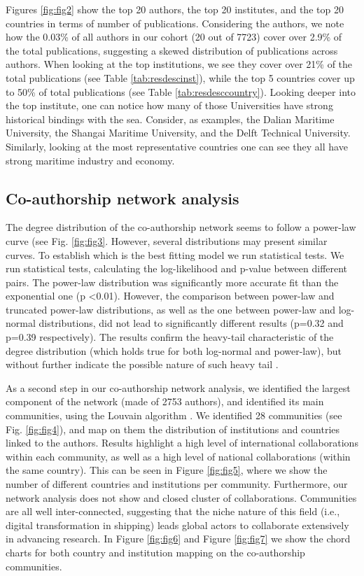 \documentclass[jmse,review,submit,pdftex,moreauthors]{Definitions/mdpi}
\begin{document}
Figures \ref{fig:fig2} show the top 20 authors, the top 20 institutes, and the top 20 countries in terms of number of publications. Considering the authors, we note how the 0.03\% of all authors in our cohort (20 out of 7723) cover over 2.9\% of the total publications, suggesting a skewed distribution of publications across authors. When looking at the top institutions, we see they cover over 21\% of the total publications (see Table \ref{tab:resdescinst}), while the top 5 countries cover up to 50\% of total publications (see Table \ref{tab:resdesccountry}). Looking deeper into the top institute, one can notice how many of those Universities have strong historical bindings with the sea. Consider, as examples, the Dalian Maritime University, the Shangai Maritime University, and the Delft Technical University. Similarly, looking at the most representative countries one can see they all have strong maritime industry and economy.

\subsection{Co-authorship network analysis}
The degree distribution of the co-authorship network seems to follow a power-law curve (see Fig. \ref{fig:fig3}. However, several distributions may present similar curves. To establish which is the best fitting model we run statistical tests. We run statistical tests, calculating the log-likelihood and p-value between different pairs. The power-law distribution was significantly more accurate fit than the exponential one (p \textless 0.01). However, the comparison between power-law and truncated power-law distributions, as well as the one between power-law and log-normal distributions, did not lead to significantly different results (p=0.32 and p=0.39 respectively). The results confirm the heavy-tail characteristic of the degree distribution (which holds true for both log-normal and power-law), but without further indicate the possible nature of such heavy tail \citep{mitzenmacher2004brief,higaki2020co,liu2021structural,smith2021explaining}.

As a second step in our co-authorship network analysis, we identified the largest component of the network (made of 2753 authors), and identified its main communities, using the Louvain algorithm \citep{blondel2008fast}. We identified 28 communities (see Fig. \ref{fig:fig4}), and map on them the distribution of institutions and countries linked to the authors. Results highlight a high level of international collaborations within each community, as well as a high level of national collaborations (within the same country). This can be seen in Figure \ref{fig:fig5}, where we show the number of different countries and institutions per community. Furthermore, our network analysis does not show and closed cluster of collaborations. Communities are all well inter-connected, suggesting that the niche nature of this field (i.e., digital transformation in shipping) leads global actors to collaborate extensively in advancing research. In Figure \ref{fig:fig6} and Figure \ref{fig:fig7} we show the chord charts for both country and institution mapping on the co-authorship communities.
\end{document}
